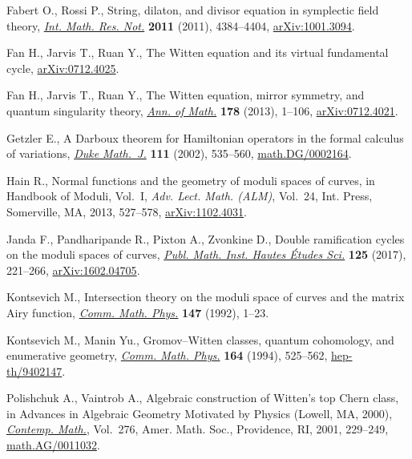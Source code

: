 \documentclass[pdftex]{sigma}
\numberwithin{equation}{section}
\newcommand{\<}{\left<}
\renewcommand{\>}{\right>}
\begin{document}
\begin{thebibliography}{99}
Fabert O., Rossi P., String, dilaton, and divisor equation in symplectic f\/ield
 theory, \href{https://doi.org/10.1093/imrn/rnq251}{\textit{Int. Math. Res. Not.}} \textbf{2011} (2011), 4384--4404,
 \href{https://arxiv.org/abs/1001.3094}{arXiv:1001.3094}.

Fan H., Jarvis T., Ruan Y., The {W}itten equation and its virtual fundamental
 cycle, \href{https://arxiv.org/abs/0712.4025}{arXiv:0712.4025}.

Fan H., Jarvis T., Ruan Y., The {W}itten equation, mirror symmetry, and quantum
 singularity theory, \href{https://doi.org/10.4007/annals.2013.178.1.1}{\textit{Ann. of Math.}} \textbf{178} (2013), 1--106,
 \href{https://arxiv.org/abs/0712.4021}{arXiv:0712.4021}.

Getzler E., A {D}arboux theorem for {H}amiltonian operators in the formal
 calculus of variations, \href{https://doi.org/10.1215/S0012-7094-02-11136-3}{\textit{Duke Math.~J.}} \textbf{111} (2002), 535--560,
 \href{https://arxiv.org/abs/math.DG/0002164}{math.DG/0002164}.

Hain R., Normal functions and the geometry of moduli spaces of curves, in
 Handbook of Moduli, {V}ol.~{I}, \textit{Adv. Lect. Math. (ALM)}, Vol.~24,
 Int. Press, Somerville, MA, 2013, 527--578, \href{https://arxiv.org/abs/1102.4031}{arXiv:1102.4031}.

Janda F., Pandharipande R., Pixton A., Zvonkine D., Double ramif\/ication cycles
 on the moduli spaces of curves, \href{https://doi.org/10.1007/s10240-017-0088-x}{\textit{Publ. Math. Inst. Hautes \'Etudes
 Sci.}} \textbf{125} (2017), 221--266, \href{https://arxiv.org/abs/1602.04705}{arXiv:1602.04705}.

Kontsevich M., Intersection theory on the moduli space of curves and the matrix
 {A}iry function, \href{https://doi.org/10.1007/BF02099526}{\textit{Comm. Math. Phys.}} \textbf{147} (1992), 1--23.

Kontsevich M., Manin Yu., Gromov--{W}itten classes, quantum cohomology, and
 enumerative geometry, \href{https://doi.org/10.1007/BF02101490}{\textit{Comm. Math. Phys.}} \textbf{164} (1994),
 525--562, \href{https://arxiv.org/abs/hep-th/9402147}{hep-th/9402147}.

Polishchuk A., Vaintrob A., Algebraic construction of {W}itten's top {C}hern
 class, in Advances in Algebraic Geo\-metry Motivated by Physics ({L}owell,
 {MA}, 2000), \href{https://doi.org/10.1090/conm/276/04523}{\textit{Contemp. Math.}}, Vol.~276, Amer. Math. Soc., Providence,
 RI, 2001, 229--249, \href{https://arxiv.org/abs/math.AG/0011032}{math.AG/0011032}.


\end{thebibliography}
\end{document}
